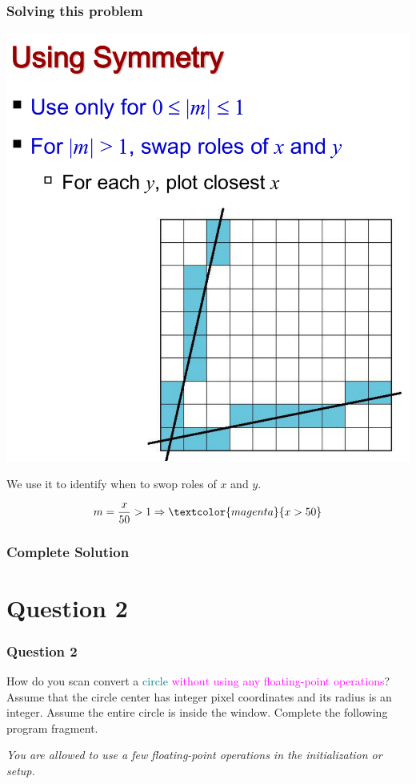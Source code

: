 \documentclass{beamer}
\begin{document}
\begin{frame}
    \frametitle{Solving this problem}

    \begin{center}
        \includegraphics[scale=0.3]{dda-soln.png}
    \end{center}

    We use it to identify when to swop roles of $x$ and $y$.
    
    \begin{equation*}
        m = \frac{x}{50} > 1 \Rightarrow \textcolor{magenta}{x > 50}
    \end{equation*}

\end{frame}

\begin{frame}
    \frametitle{Complete Solution}

    

\end{frame}

\section{Question 2}

\begin{frame}
    \frametitle{Question 2}
    How do you scan convert a \textcolor{teal}{circle} \textcolor{magenta}{without using any floating-point operations}? 
    Assume that the circle center has integer pixel coordinates and its radius is an integer. 
    Assume the entire circle is inside the window. 
    Complete the following program fragment. 

    \vspace{1em}
    
    \textit{You are allowed to use a few floating-point operations in the initialization or setup.}
\end{frame}
\end{document}
